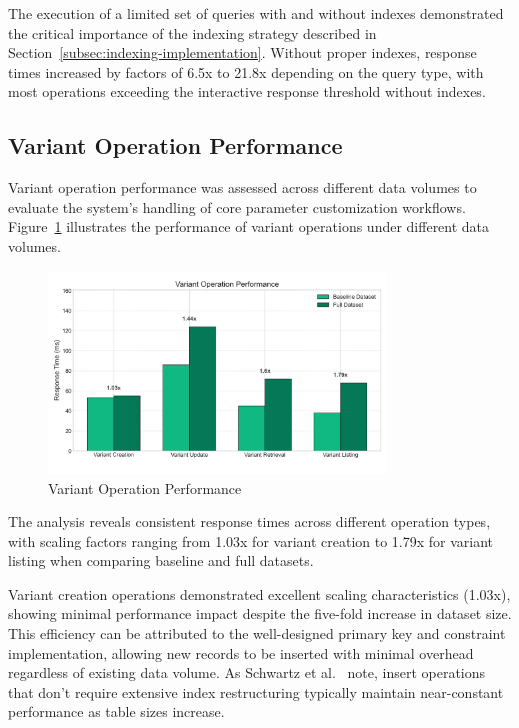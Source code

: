 The execution of a limited set of queries with and without indexes demonstrated the critical importance of the indexing strategy described in Section~\ref{subsec:indexing-implementation}. Without proper indexes, response times increased by factors of 6.5x to 21.8x depending on the query type, with most operations exceeding the interactive response threshold without indexes.

\subsection{Variant Operation Performance}
\label{subsec:variant-operation-performance}

Variant operation performance was assessed across different data volumes to evaluate the system's handling of core parameter customization workflows. Figure~\ref{fig:variant-performance} illustrates the performance of variant operations under different data volumes.

\begin{figure}[h]
    \centering
    \includegraphics[width=0.8\textwidth]{figures/variant_performance.png}
    \caption{Variant Operation Performance}
    \label{fig:variant-performance}
\end{figure}

The analysis reveals consistent response times across different operation types, with scaling factors ranging from 1.03x for variant creation to 1.79x for variant listing when comparing baseline and full datasets.

Variant creation operations demonstrated excellent scaling characteristics (1.03x), showing minimal performance impact despite the five-fold increase in dataset size. This efficiency can be attributed to the well-designed primary key and constraint implementation, allowing new records to be inserted with minimal overhead regardless of existing data volume. As Schwartz et al.~\cite{schwartz2012high} note, insert operations that don't require extensive index restructuring typically maintain near-constant performance as table sizes increase.

